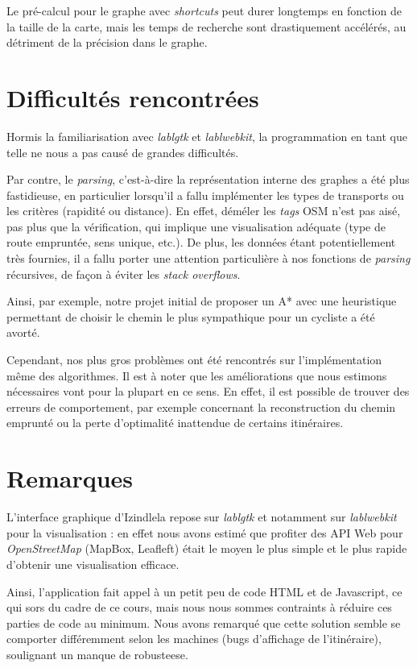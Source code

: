 \documentclass[a4paper, 11pt, DIV=12, numbers=enddot]{scrartcl}
\begin{document}
Le pré-calcul pour le graphe avec \emph{shortcuts} peut durer longtemps en fonction de la taille de la carte, mais les temps de recherche sont drastiquement accélérés, au détriment de la précision dans le graphe.


\section{Difficultés rencontrées}

Hormis la familiarisation avec \emph{lablgtk} et \emph{lablwebkit}, la programmation en tant que telle ne nous a pas causé de grandes difficultés. \newline

Par contre, le \emph{parsing}, c'est-à-dire la représentation interne des graphes a été plus fastidieuse, en particulier lorsqu'il a fallu implémenter les types de transports ou les critères (rapidité ou distance). En effet, déméler les \emph{tags} OSM n'est pas aisé, pas plus que la vérification, qui implique une visualisation adéquate (type de route empruntée, sens unique, etc.). De plus, les données étant potentiellement très fournies, il a fallu porter une attention particulière à nos fonctions de \emph{parsing} récursives, de façon à éviter les \emph{stack overflows}.

Ainsi, par exemple, notre projet initial de proposer un A* avec une heuristique permettant de choisir le chemin le plus sympathique pour un cycliste a été avorté. \newline

Cependant, nos plus gros problèmes ont été rencontrés sur l'implémentation même des algorithmes. Il est à noter que les améliorations que nous estimons nécessaires vont pour la plupart en ce sens. En effet, il est possible de trouver des erreurs de comportement, par exemple concernant la reconstruction du chemin emprunté ou la perte d'optimalité inattendue de certains itinéraires.

\newpage
\section{Remarques}

L'interface graphique d'Izindlela repose sur \emph{lablgtk} et notamment sur \emph{lablwebkit} pour la visualisation : en effet nous avons estimé que profiter des API Web pour \emph{OpenStreetMap} (MapBox, Leafleft) était le moyen le plus simple et le plus rapide d'obtenir une visualisation efficace.

Ainsi, l'application fait appel à un petit peu de code HTML et de Javascript, ce qui sors du cadre de ce cours, mais nous nous sommes contraints à réduire ces parties de code au minimum. Nous avons remarqué que cette solution semble se comporter différemment selon les machines (bugs d'affichage de l'itinéraire), soulignant un manque de robusteese.
\end{document}
